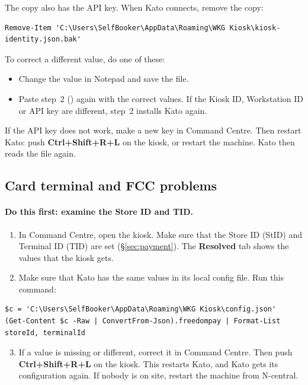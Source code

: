 \documentclass[a4paper,10pt]{article}
\begin{document}
\noindent The copy also has the API key. When Kato connects, remove the copy:

\begin{lstlisting}
Remove-Item 'C:\Users\SelfBooker\AppData\Roaming\WKG Kiosk\kiosk-identity.json.bak'
\end{lstlisting}

\noindent To correct a different value, do one of these:

\begin{itemize}
  \item Change the value in Notepad and save the file.
  \item Paste step~2 () again with the correct
        values. If the Kiosk ID, Workstation ID or API key are different,
        step~2 installs Kato again.
\end{itemize}

\noindent If the API key does not work, make a new key in Command Centre. Then
restart Kato: push \textbf{Ctrl+Shift+R+L} on the kiosk, or restart the machine. Kato
then reads the file again.

\subsection{Card terminal and FCC problems}\label{sec:fcctrouble}

\paragraph{Do this first: examine the Store ID and TID.}
\begin{enumerate}
  \item In Command Centre, open the kiosk. Make sure that the Store ID
        (StID) and Terminal ID (TID) are set (\S\ref{sec:payment}). The
        \textbf{Resolved} tab shows the values that the kiosk gets.
  \item Make sure that Kato has the same values in its local config file.
        Run this command:
\end{enumerate}

\begin{lstlisting}
$c = 'C:\Users\SelfBooker\AppData\Roaming\WKG Kiosk\config.json'
(Get-Content $c -Raw | ConvertFrom-Json).freedompay | Format-List storeId, terminalId
\end{lstlisting}

\begin{enumerate}\setcounter{enumi}{2}
  \item If a value is missing or different, correct it in Command Centre.
        Then push \textbf{Ctrl+Shift+R+L} on the kiosk. This restarts Kato, and Kato
        gets its configuration again. If nobody is on site, restart the
        machine from N-central.
\end{enumerate}
\end{document}
